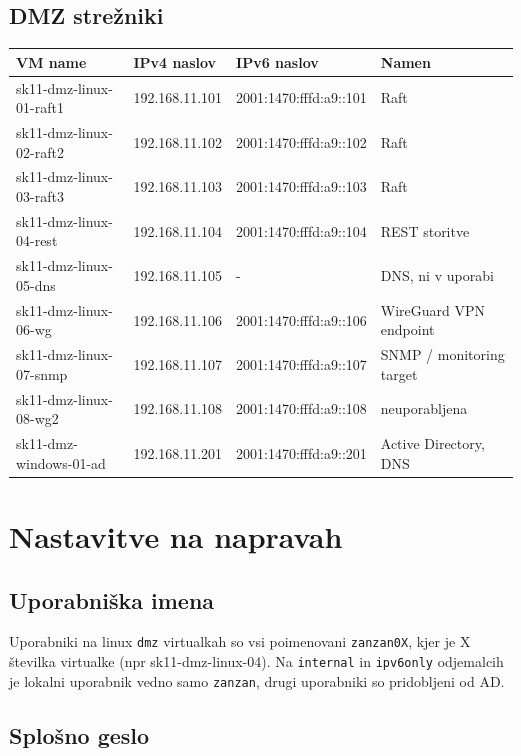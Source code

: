 \documentclass[a4paper,11pt]{article}
\begin{document}
\subsection{DMZ strežniki}
\begin{longtable}{|l|l|l|l|}
\hline
\textbf{VM name} & \textbf{IPv4 naslov} & \textbf{IPv6 naslov} & \textbf{Namen} \\
\hline
sk11-dmz-linux-01-raft1 & 192.168.11.101 & 2001:1470:fffd:a9::101 & Raft \\
\hline
sk11-dmz-linux-02-raft2 & 192.168.11.102 & 2001:1470:fffd:a9::102 & Raft \\
\hline
sk11-dmz-linux-03-raft3 & 192.168.11.103 & 2001:1470:fffd:a9::103 & Raft \\
\hline
sk11-dmz-linux-04-rest & 192.168.11.104 & 2001:1470:fffd:a9::104 & REST storitve \\
\hline
sk11-dmz-linux-05-dns & 192.168.11.105 & - & DNS, ni v uporabi \\
\hline
sk11-dmz-linux-06-wg & 192.168.11.106 & 2001:1470:fffd:a9::106 & WireGuard VPN endpoint \\
\hline
sk11-dmz-linux-07-snmp & 192.168.11.107 & 2001:1470:fffd:a9::107 & SNMP / monitoring target \\
\hline
sk11-dmz-linux-08-wg2 & 192.168.11.108 & 2001:1470:fffd:a9::108 & neuporabljena \\
\hline
sk11-dmz-windows-01-ad & 192.168.11.201 & 2001:1470:fffd:a9::201 & Active Directory, DNS\\
\hline
\end{longtable}

\section{Nastavitve na napravah}

\subsection{Uporabniška imena}
Uporabniki na linux \texttt{dmz} virtualkah so vsi poimenovani \texttt{zanzan0X}, kjer je X številka virtualke (npr sk11-dmz-linux-04).
Na \texttt{internal} in \texttt{ipv6only} odjemalcih je lokalni uporabnik vedno samo \texttt{zanzan}, drugi uporabniki so pridobljeni od AD.

\subsection{Splošno geslo}
\begin{center}
\end{center}
\end{document}
